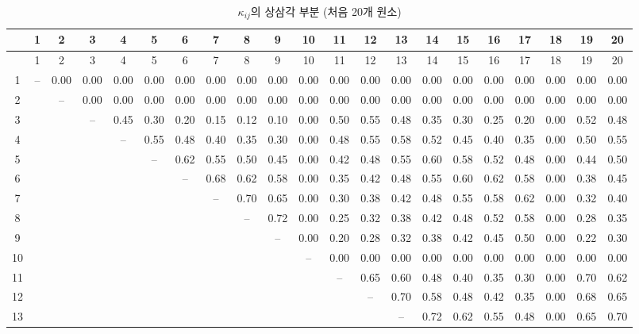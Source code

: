 \documentclass[12pt,a4paper]{article}
\begin{document}
	{\tiny
		\begin{longtable}{c|*{20}{c}}
			\caption{\(\kappa_{ij}\)의 상삼각 부분 (처음 20개 원소)} \label{tab:kappa-full-20} \\
			\toprule
			& 1 & 2 & 3 & 4 & 5 & 6 & 7 & 8 & 9 & 10 & 11 & 12 & 13 & 14 & 15 & 16 & 17 & 18 & 19 & 20 \\
			\midrule
			\endfirsthead
			\toprule
			& 1 & 2 & 3 & 4 & 5 & 6 & 7 & 8 & 9 & 10 & 11 & 12 & 13 & 14 & 15 & 16 & 17 & 18 & 19 & 20 \\
			\midrule
			\endhead
			1  & – & 0.00 & 0.00 & 0.00 & 0.00 & 0.00 & 0.00 & 0.00 & 0.00 & 0.00 & 0.00 & 0.00 & 0.00 & 0.00 & 0.00 & 0.00 & 0.00 & 0.00 & 0.00 & 0.00 \\
			2  &   & – & 0.00 & 0.00 & 0.00 & 0.00 & 0.00 & 0.00 & 0.00 & 0.00 & 0.00 & 0.00 & 0.00 & 0.00 & 0.00 & 0.00 & 0.00 & 0.00 & 0.00 & 0.00 \\
			3  &   &   & – & 0.45 & 0.30 & 0.20 & 0.15 & 0.12 & 0.10 & 0.00 & 0.50 & 0.55 & 0.48 & 0.35 & 0.30 & 0.25 & 0.20 & 0.00 & 0.52 & 0.48 \\
			4  &   &   &   & – & 0.55 & 0.48 & 0.40 & 0.35 & 0.30 & 0.00 & 0.48 & 0.55 & 0.58 & 0.52 & 0.45 & 0.40 & 0.35 & 0.00 & 0.50 & 0.55 \\
			5  &   &   &   &   & – & 0.62 & 0.55 & 0.50 & 0.45 & 0.00 & 0.42 & 0.48 & 0.55 & 0.60 & 0.58 & 0.52 & 0.48 & 0.00 & 0.44 & 0.50 \\
			6  &   &   &   &   &   & – & 0.68 & 0.62 & 0.58 & 0.00 & 0.35 & 0.42 & 0.48 & 0.55 & 0.60 & 0.62 & 0.58 & 0.00 & 0.38 & 0.45 \\
			7  &   &   &   &   &   &   & – & 0.70 & 0.65 & 0.00 & 0.30 & 0.38 & 0.42 & 0.48 & 0.55 & 0.58 & 0.62 & 0.00 & 0.32 & 0.40 \\
			8  &   &   &   &   &   &   &   & – & 0.72 & 0.00 & 0.25 & 0.32 & 0.38 & 0.42 & 0.48 & 0.52 & 0.58 & 0.00 & 0.28 & 0.35 \\
			9  &   &   &   &   &   &   &   &   & – & 0.00 & 0.20 & 0.28 & 0.32 & 0.38 & 0.42 & 0.45 & 0.50 & 0.00 & 0.22 & 0.30 \\
			10 &   &   &   &   &   &   &   &   &   & – & 0.00 & 0.00 & 0.00 & 0.00 & 0.00 & 0.00 & 0.00 & 0.00 & 0.00 & 0.00 \\
			11 &   &   &   &   &   &   &   &   &   &   & – & 0.65 & 0.60 & 0.48 & 0.40 & 0.35 & 0.30 & 0.00 & 0.70 & 0.62 \\
			12 &   &   &   &   &   &   &   &   &   &   &   & – & 0.70 & 0.58 & 0.48 & 0.42 & 0.35 & 0.00 & 0.68 & 0.65 \\
			13 &   &   &   &   &   &   &   &   &   &   &   &   & – & 0.72 & 0.62 & 0.55 & 0.48 & 0.00 & 0.65 & 0.70 \\

\end{longtable}}
\end{document}
